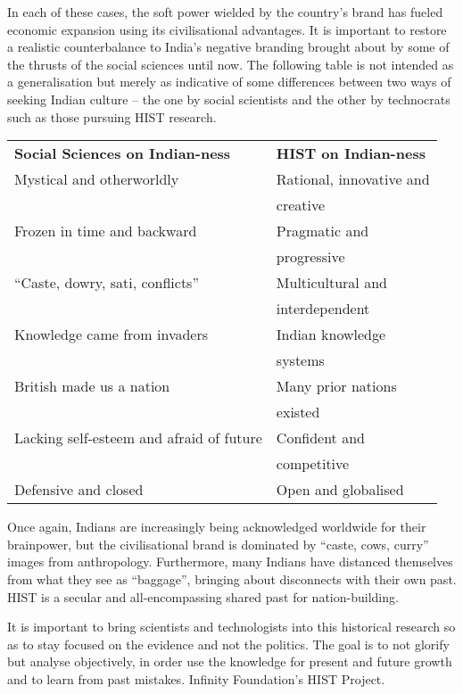 In each of these cases, the soft power wielded by the country’s brand has fueled economic expansion using its civilisational advantages. It is important to restore a realistic counterbalance to India’s negative branding brought about by some of the thrusts of the social sciences until now. The following table is not intended as a generalisation but merely as indicative of some differences between two ways of seeking Indian culture – the one by social scientists and the other by technocrats such as those pursuing HIST research.

\newpage

\begin{tabular}{ll}
\textbf{Social Sciences on Indian-ness}    &  \textbf{HIST on Indian-ness}\\
 Mystical and otherworldly   &  Rational, innovative and\\
  & creative\\
 Frozen in time and backward &   Pragmatic and\\ 
 & progressive\\ 
 “Caste, dowry, sati, conflicts”  & Multicultural and\\
 & interdependent\\
 Knowledge came from invaders & Indian knowledge\\
 & systems\\
 British made us a nation & Many prior nations\\ 
 & existed\\
 Lacking self-esteem and afraid of future  & Confident and\\
        & competitive\\
 Defensive and closed & Open and globalised
\end{tabular}

Once again, Indians are increasingly being acknowledged worldwide for their brainpower, but the civilisational brand is dominated by “caste, cows, curry” images from anthropology. Furthermore, many Indians have distanced themselves from what they see as “baggage”, bringing about disconnects with their own past. HIST is a secular and all-encompassing shared past for nation-building.

It is important to bring scientists and technologists into this historical research so as to stay focused on the evidence and not the politics. The goal is to not glorify but analyse objectively, in order use the knowledge for present and future growth and to learn from past mistakes. Infinity Foundation’s HIST Project.

